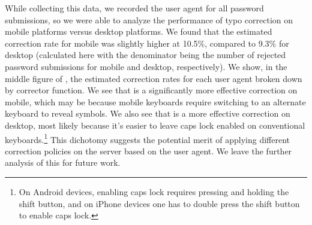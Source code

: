 While collecting this data, we recorded the user agent for all
password submissions, so we were able to analyze the performance of
typo correction on mobile platforms versus desktop platforms.  We
found that the estimated correction rate for mobile was slightly
higher at 10.5\%, compared to 9.3\% for desktop (calculated here with
the denominator being the number of rejected password submissions for
mobile and desktop, respectively). We show, in the middle figure of
, the estimated correction rates for
each user agent broken down by corrector function.  We see that
\dtoslast is a significantly more effective correction on mobile,
which may be because mobile keyboards require switching to an
alternate keyboard to reveal symbols.  We also see that \swcall is a
more effective correction on desktop, most likely because it's easier
to leave caps lock enabled on conventional keyboards.\footnote{On
  Android devices, enabling caps lock requires pressing and holding
  the shift button, and on iPhone devices one has to double press the
  shift button to enable caps lock.}  %
This dichotomy suggests the potential merit
of applying different correction policies on the server based on the
user agent. We leave the further analysis of this for future work. 






